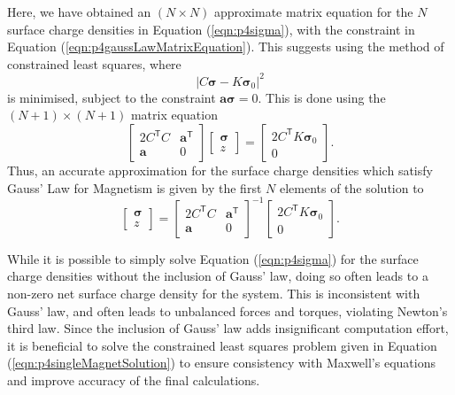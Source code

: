 Here, we have obtained an \(\left(N \times N\right)\) approximate matrix equation for the \(N\) surface charge densities in Equation (\ref{eqn:p4sigma}), with the constraint in Equation (\ref{eqn:p4gaussLawMatrixEquation}). This suggests using the method of constrained least squares, where
\begin{equation}
    \left| C\bm{\sigma} - K \bm{\sigma}_0 \right|^2
\end{equation}
is minimised, subject to the constraint \(\mathbf{a}\bm{\sigma} = 0\). This is done using the \( \left( N+1 \right) \times \left( N+1 \right)\) matrix equation
\begin{equation}
    \begin{bmatrix} 2C^\mathsf{T}C & \mathbf{a}^\mathsf{T} \\ \mathbf{a} & 0 \end{bmatrix} \begin{bmatrix} \bm{\sigma} \\ z \end{bmatrix} = \begin{bmatrix} 2C^\mathsf{T} K \bm{\sigma}_0 \\ 0 \end{bmatrix} \text{.}
\end{equation}
Thus, an accurate approximation for the surface charge densities which satisfy Gauss' Law for Magnetism is given by the first \(N\) elements of the solution to
\begin{equation}\label{eqn:p4singleMagnetSolution}
     \begin{bmatrix} \bm{\sigma} \\ z \end{bmatrix} = \begin{bmatrix} 2C^\mathsf{T}C & \mathbf{a}^\mathsf{T} \\ \mathbf{a} & 0 \end{bmatrix}^{-1} \begin{bmatrix} 2C^\mathsf{T} K \bm{\sigma}_0 \\ 0 \end{bmatrix} \text{.}
\end{equation}

While it is possible to simply solve Equation (\ref{eqn:p4sigma}) for the surface charge densities without the inclusion of Gauss' law, doing so often leads to a non-zero net surface charge density for the system. This is inconsistent with Gauss' law, and often leads to unbalanced forces and torques, violating Newton's third law. Since the inclusion of Gauss' law adds insignificant computation effort, it is beneficial to solve the constrained least squares problem given in Equation (\ref{eqn:p4singleMagnetSolution}) to ensure consistency with Maxwell's equations and improve accuracy of the final calculations.

